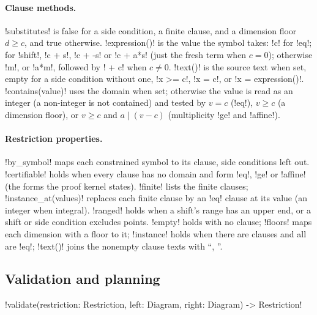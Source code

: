 \paragraph{Clause methods.} \py!substitutes! is false for a side condition, a finite clause, and a dimension floor $d\ge c$, and true otherwise. \py!expression()! is the value the symbol takes: \code!c! for \code!eq!; for \code!shift!, \code!c + s!, \code!c + -s! or \code!c + a*s! (just the fresh term when $c=0$); otherwise \code!m!, or \code!a*m!, followed by \code! + c! when $c\ne0$. \py!text()! is the source text when set, empty for a side condition without one, \code!x >= c!, \code!x = c!, or \code!x = expression()!. \py!contains(value)! uses the domain when set; otherwise the value is read as an integer (a non-integer is not contained) and tested by $v=c$ (\code!eq!), $v\ge c$ (a dimension floor), or $v\ge c$ and $a\mid(v-c)$ (multiplicity \code!ge! and \code!affine!).

\paragraph{Restriction properties.} \py!by_symbol! maps each constrained symbol to its clause, side conditions left out. \py!certifiable! holds when every clause has no domain and form \code!eq!, \code!ge! or \code!affine! (the forms the proof kernel states). \py!finite! lists the finite clauses; \py!instance_at(values)! replaces each finite clause by an \code!eq! clause at its value (an integer when integral). \py!ranged! holds when a shift's range has an upper end, or a shift or side condition excludes points. \py!empty! holds with no clause; \py!floors! maps each dimension with a floor to it; \py!instance! holds when there are clauses and all are \code!eq!; \py!text()! joins the nonempty clause texts with ``, ''.

\subsection{Validation and planning}

\begin{signature}
\py!validate(restriction: Restriction, left: Diagram, right: Diagram) -> Restriction!
\end{signature}

